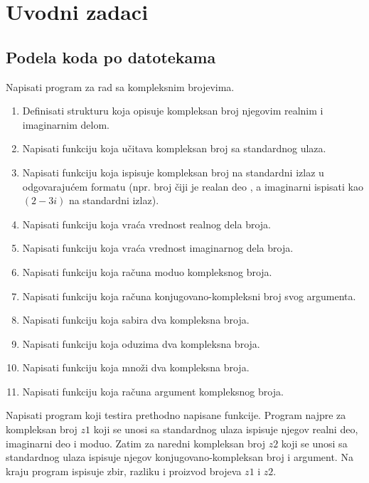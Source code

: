 \chapter{Uvodni zadaci}

\section{Podela koda po datotekama}

\begin{Exercise}[label=001] %
Napisati program za rad sa kompleksnim brojevima.
\begin{enumerate}
\item Definisati strukturu  koja opisuje kompleksan broj njegovim realnim i imaginarnim delom.
\item Napisati funkciju  koja učitava kompleksan broj sa standardnog ulaza.
\item Napisati funkciju  koja ispisuje kompleksan broj na standardni izlaz u odgovarajućem formatu (npr. broj čiji je realan deo , a imaginarni  ispisati kao $(2 - 3 i)$ na standardni izlaz).
\item Napisati funkciju  koja vraća vrednost realnog dela broja.
\item Napisati funkciju  koja vraća vrednost imaginarnog dela broja.
\item Napisati funkciju  koja računa moduo kompleksnog broja.
\item Napisati funkciju  koja računa konjugovano-kompleksni broj svog argumenta.
\item Napisati funkciju  koja sabira dva kompleksna broja.
\item Napisati funkciju  koja oduzima dva kompleksna broja.
\item Napisati funkciju  koja množi dva kompleksna broja.
\item Napisati funkciju  koja računa argument kompleksnog broja.
\end{enumerate}

Napisati program koji testira prethodno napisane funkcije. Program najpre za kompleksan broj $z1$ koji se unosi sa standardnog ulaza ispisuje njegov realni deo, imaginarni deo i moduo. Zatim za naredni kompleksan broj $z2$ koji se unosi sa standardnog ulaza ispisuje njegov konjugovano-kompleksan broj i argument. Na kraju program ispisuje zbir, razliku i proizvod brojeva $z1$ i $z2$.


\end{Exercise}
